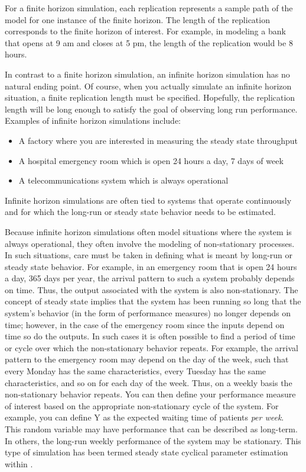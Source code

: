 \documentclass[
]{book}
\theoremstyle{definition}
\theoremstyle{definition}
\theoremstyle{definition}
\theoremstyle{definition}
\theoremstyle{remark}
\begin{document}
For a finite horizon simulation, each replication represents a sample
path of the model for one instance of the finite horizon. The length of
the replication corresponds to the finite horizon of interest. For
example, in modeling a bank that opens at 9 am and closes at 5 pm, the
length of the replication would be 8 hours.

In contrast to a finite horizon simulation, an infinite horizon
simulation has no natural ending point. Of course, when you actually
simulate an infinite horizon situation, a finite replication length must
be specified. Hopefully, the replication length will be long enough to
satisfy the goal of observing long run performance. Examples of infinite
horizon simulations include:

\begin{itemize}
\item
  A factory where you are interested in measuring the steady state
  throughput
\item
  A hospital emergency room which is open 24 hours a day, 7 days of
  week
\item
  A telecommunications system which is always operational
\end{itemize}

Infinite horizon simulations are often tied to systems that operate
continuously and for which the long-run or steady state behavior needs
to be estimated.

Because infinite horizon simulations often model situations where the
system is always operational, they often involve the modeling of
non-stationary processes. In such situations, care must be taken in
defining what is meant by long-run or steady state behavior. For
example, in an emergency room that is open 24 hours a day, 365 days per
year, the arrival pattern to such a system probably depends on time.
Thus, the output associated with the system is also non-stationary. The
concept of steady state implies that the system has been running so long
that the system's behavior (in the form of performance measures) no
longer depends on time; however, in the case of the emergency room since
the inputs depend on time so do the outputs. In such cases it is often
possible to find a period of time or cycle over which the non-stationary
behavior repeats. For example, the arrival pattern to the emergency room
may depend on the day of the week, such that every Monday has the same
characteristics, every Tuesday has the same characteristics, and so on
for each day of the week. Thus, on a weekly basis the non-stationary
behavior repeats. You can then define your performance measure of
interest based on the appropriate non-stationary cycle of the system.
For example, you can define Y as the expected waiting time of patients
\emph{per week}. This random variable may have performance that can be
described as long-term. In others, the long-run weekly performance of
the system may be stationary. This type of simulation has been termed
steady state cyclical parameter estimation within \citep{law2007simulation}.
\end{document}
